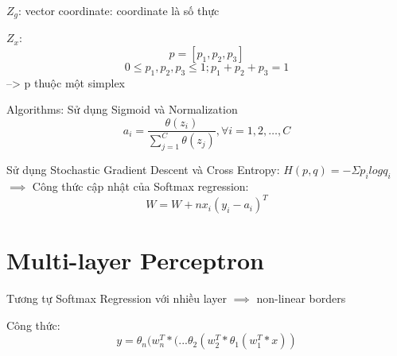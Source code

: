 \documentclass{article}
\begin{document}
$Z_g$: vector coordinate: coordinate là số thực

$Z_x$:
$$p = [p_1, p_2, p_3]$$
$$0 \leq p_1, p_2, p_3 \leq 1; p_1 + p_2 + p_3 = 1$$
--> p thuộc một simplex

Algorithms: Sử dụng Sigmoid và Normalization
$$a_i = \frac{\theta(z_i)}{\sum_{j = 1}^{C}{\theta(z_j)}} , \forall i = 1,2,\dots,C$$

Sử dụng Stochastic Gradient Descent và Cross Entropy: $H(p,q) = - \Sigma p_i log q_i$ $\implies$ Công thức cập nhật của Softmax regression:
$$W = W + n x_i(y_i - a_i)^T $$

\section{Multi-layer Perceptron}

Tương tự Softmax Regression với nhiều layer $\implies$ non-linear borders

Công thức:
$$y =  \theta_n(w_n^T*(...\theta_2(w_2^T*\theta_1(w_1^T*x))$$
\end{document}
